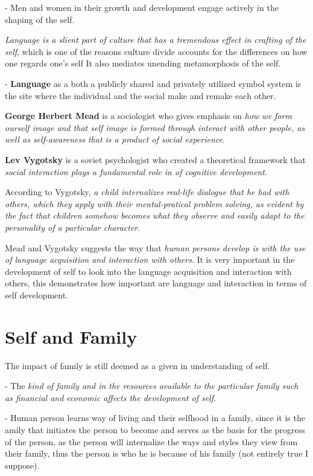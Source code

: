 \documentclass[12pt, UTF8]{article}
\begin{document}
	- Men and women in their growth and development engage actively in the shaping of the self.
	
	\emph{Language is a slient part of culture that has a tremendous effect in crafting of the self}, which is one of the reasons culture divide accounts for the differences on how one regards one's self It also mediates unending metamorphosis of the self.
	
	- \textbf{Language} as a both a publicly shared and privately utilized symbol system is the site where the individual and the social make and remake each other.
	
	\textbf{George Herbert Mead} is a sociologist who gives emphasis on \emph{how we form ourself image and that self image is formed through interact with other people, as well as self-awareness that is a product of social experience}.
	
	\textbf{Lev Vygotsky} is a soviet psychologist who created a theoretical framework that \emph{social interaction plays a fundamental role in of cognitive development}.
	
	According to Vygotsky, \textit{a child internalizes real-life dialogue that he had with others, which they apply with their mental-pratical problem solving, as evident by the fact that children somehow becomes what they observe and easily adapt to the personality of a particular character}.
	
	Mead and Vygotsky suggests the way that \emph{human persons develop is with the use of language acquisition and interaction with others}. It is very important in the development of self to look into the language acquisition and interaction with others, this demonstrates how important are language and interaction in terms of self development.
	
	\section{Self and Family}
	
	The impact of family is still deemed as a given in understanding of self.
	
	- The \textit{kind of family and in the resources available to the particular family such as financial and economic affects the development of self}.
	
	- Human person learns way of living and their selfhood in a family, since it is the amily that initiates the person to become and serves as the basis for the progress of the person, as the person will internalize the ways and styles they view from their family, thus the person is who he is because of his family (not entirely true I suppose).
	
\end{document}
